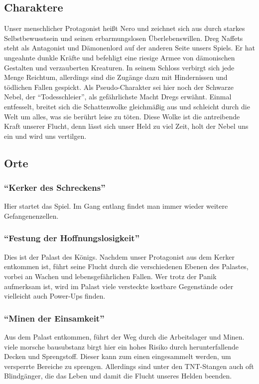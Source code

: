 \documentclass{article}
\begin{document}
\subsection{Charaktere}
Unser menschlicher Protagonist heißt Nero und zeichnet sich aus durch starkes
Selbstbewusstsein und seinen erbarmungslosen Überlebenswillen. \newline
Dreg Naffets steht als Antagonist und Dämonenlord auf der anderen Seite
unsers Spiels.
Er hat ungeahnte dunkle Kräfte und befehligt eine riesige Armee von dämonischen Gestalten
und verzauberten Kreaturen. In seinem Schloss verbirgt sich jede Menge Reichtum, allerdings
sind die Zugänge dazu mit Hindernissen und tödlichen Fallen gespickt.
Als Pseudo-Charakter sei hier noch der Schwarze Nebel, der “Todesschleier”, als gefährlichste
Macht Dregs erwähnt. Einmal entfesselt, breitet sich die Schattenwolke gleichmäßig aus und
schleicht durch die Welt um alles, was sie berührt leise zu töten. Diese Wolke ist die
antreibende Kraft unserer Flucht, denn lässt sich unser Held zu viel Zeit, holt der Nebel uns
ein und wird uns vertilgen.

\vspace{1cm}
\subsection{Orte}
\subsubsection{“Kerker des Schreckens”}
Hier startet das Spiel. Im Gang entlang findet man immer wieder weitere Gefangenenzellen. \newline
\subsubsection{“Festung der Hoffnungslosigkeit”}
Dies ist der Palast des Königs. Nachdem unser Protagonist aus dem Kerker entkommen ist,
führt seine Flucht durch die verschiedenen Ebenen des Palastes, vorbei an Wachen und
lebensgefährlichen Fallen. Wer trotz der Panik aufmerksam ist, wird im Palast viele versteckte
kostbare Gegenstände oder vielleicht auch Power-Ups finden. \newline
\subsubsection{“Minen der Einsamkeit”}
Aus dem Palast entkommen, führt der Weg durch die Arbeitslager und Minen. viele morsche
bausubstanz birgt hier ein hohes Risiko durch herunterfallende Decken und Sprengstoff.
Dieser kann zum einen eingesammelt werden, um versperrte Bereiche zu sprengen. Allerdings
sind unter den TNT-Stangen auch oft Blindgänger, die das Leben und damit die Flucht unseres
Helden beenden. \newline
\end{document}
